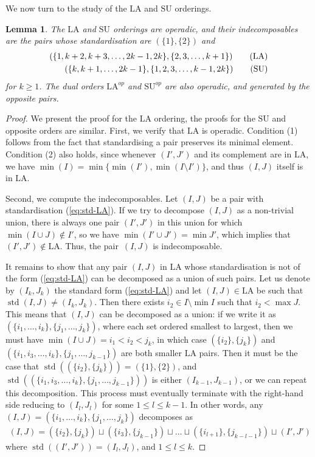 \documentclass{amsart}
\newtheorem{lemma}[theorem]{Lemma}
\theoremstyle{definition}
\DeclareMathOperator{\std}{std}
\newcommand{\SU}{\mathrm{SU}}
\newcommand{\LA}{\mathrm{LA}}
\begin{document}
We now turn to the study of the $\LA$ and $\SU$ orderings.

\begin{lemma} 
\label{lem:operadic-ordering}
The $\LA$ and $\SU$ orderings are operadic, and their indecomposables are the pairs whose standardisation are $(\{1\},\{2\})$ and
\begin{align}
(\{1,k+2,k+3,\dots,2k-1,2k\}, \{2,3,\dots,k+1\}) \tag{$\LA$} \label{eq:std-LA} \\
(\{k,k+1,\dots,2k-1\},\{1,2,3,\dots,k-1,2k\}) \tag{$\SU$}
\end{align} 
for $k\geq 1$. 
The dual orders $\LA^{op}$ and $\SU^{op}$ are also operadic, and generated by the opposite pairs.
\end{lemma}

\begin{proof}
We present the proof for the $\LA$ ordering, the proofs for the $\SU$ and opposite orders are similar.
First, we verify that $\LA$ is operadic. 
Condition (1) follows from the fact that standardising a pair preserves its minimal element.
Condition (2) also holds, since whenever $(I',J')$ and its complement are in $\LA$, we have $\min(I)=\min\{\min(I'),\min(I\setminus I')\}$, and thus $(I,J)$ itself is in $\LA$.

Second, we compute the indecomposables. 
Let $(I,J)$ be a pair with standardisation (\ref{eq:std-LA}).
If we try to decompose $(I,J)$ as a non-trivial union, there is always one pair $(I',J')$ in this union for which~$\min (I\cup J) \notin I'$, so we have $\min ( I' \cup J') = \min J'$, which implies that $(I',J') \notin \LA$.
Thus, the pair~$(I,J)$ is indecomposable. 

It remains to show that any pair $(I,J)$ in $\LA$ whose standardisation is not of the form (\ref{eq:std-LA}) can be decomposed as a union of such pairs. 
Let us denote by $(I_k,J_k)$ the standard form (\ref{eq:std-LA}) and let $(I,J)\in \LA$ be such that $\std(I,J) \neq (I_k,J_k)$.
Then there exists $i_2 \in I\setminus \min I$ such that $i_2 < \max J$.
This means that $(I,J)$ can be decomposed as a union: if we write it as $(\{i_1,\dots,i_k\},\{j_1,\dots,j_k\})$, where each set ordered smallest to largest, then we must have $\min (I\cup J)=i_1<i_2<j_k$, in which case $(\{i_2\},\{j_k\})$ and $(\{i_1,i_3,\dots,i_k\},\{j_1,\dots,j_{k-1}\})$ are both smaller $\LA$ pairs.
Then it must be the case that $\std((\{i_2\},\{j_k\})) = (\{1\},\{2\})$, and $\std((\{i_1,i_3,\dots,i_k\},\{j_1,\dots,j_{k-1}\}))$ is either $(I_{k-1},J_{k-1})$, or we can repeat this decomposition.
This process must eventually terminate with the right-hand side reducing to $(I_l,J_l)$ for some $1 \leq l \leq k-1$.
In other words, any $(I,J) = (\{i_1,\dots,i_k\}, \{j_1,\dots,j_k\})$ decomposes as
\begin{align*}
	(I,J) = (\{i_2\},\{j_k\}) \sqcup (\{i_3\},\{j_{k-1}\}) \sqcup \dots \sqcup (\{i_{l+1} \},\{j_{k-l-1} \}) \sqcup (I',J')
\end{align*}
where $\std((I',J')) = (I_l,J_l)$, and $1\leq l \leq k$.
\end{proof}
\end{document}
